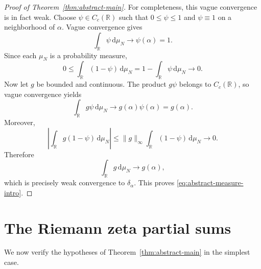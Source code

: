 \documentclass[11pt]{article}
\theoremstyle{definition}
\newcommand{\R}{\mathbb R}
\newcommand{\dd}{\,\mathrm d}
\newcommand{\1}{\mathbf 1}
\begin{document}
\begin{proof}[Proof of Theorem~\ref{thm:abstract-main}]
For completeness, this vague convergence is in fact weak.  Choose $\psi\in C_c(\R)$ such that $0\le\psi\le1$ and $\psi\equiv1$ on a neighborhood of $\alpha$.  Vague convergence gives
\[
\int_\R\psi\dd\mu_N\longrightarrow\psi(\alpha)=1.
\]
Since each $\mu_N$ is a probability measure,
\[
0\le \int_\R(1-\psi)\dd\mu_N
=1-\int_\R\psi\dd\mu_N\longrightarrow0.
\]
Now let $g$ be bounded and continuous.  The product $g\psi$ belongs to $C_c(\R)$, so vague convergence yields
\[
\int_\R g\psi\dd\mu_N\longrightarrow g(\alpha)\psi(\alpha)=g(\alpha).
\]
Moreover,
\[
\left|\int_\R g(1-\psi)\dd\mu_N\right|
\le \|g\|_\infty\int_\R(1-\psi)\dd\mu_N\longrightarrow0.
\]
Therefore
\[
\int_\R g\dd\mu_N\longrightarrow g(\alpha),
\]
which is precisely weak convergence to $\delta_\alpha$.  This proves \eqref{eq:abstract-measure-intro}.
\end{proof}

\section{The Riemann zeta partial sums}\label{sec:zeta}

We now verify the hypotheses of Theorem~\ref{thm:abstract-main} in the simplest case.
\end{document}

